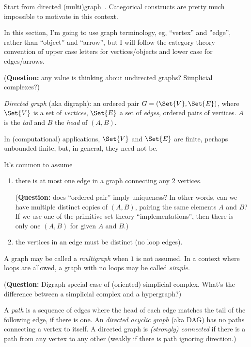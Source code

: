 \documentclass[11pt,openany]{article}
\begin{document}
Start from directed (multi)graph~\cite{wiki:Directed_graph}.
Categorical constructs are pretty much impossible to motivate
in this context.

In this section, I'm going to use graph terminology,
eg, ``vertex'' and ''edge'', rather than ``object'' and ``arrow'',
but I will follow the category theory convention of
upper case letters for vertices/objects and lower case for
edges/arrows.

\label{sec:Directed_graph}

(\textbf{Question:}
 any value is thinking about undirected graphs?
 Simplicial complexes?)

\textit{Directed graph} (aka digraph): 
an ordered pair $G=\left( \Set{V}, \Set{E} \right)$,
where $\Set{V}$ is a set of \textit{vertices}, 
$\Set{E}$ a set of \textit{edges}, ordered pairs of vertices.
$A$ is the \textit{tail} and $B$ the \textit{head}
of $\left(A,B\right)$.

In (computational) applications, $\Set{V}$ and $\Set{E}$ 
are finite, perhaps unbounded finite,
but, in general, they need not be.

It's common to assume 
\begin{enumerate}
\item there is at most one edge
in a graph connecting any $2$ vertices.\par
(\textbf{Question:} does ``ordered pair'' imply uniqueness?
In other words, can we have multiple distinct copies of
 $\left(A,B\right)$, pairing the same elements $A$ and $B$?
 If we use one of the primitive set theory ``implementations'',
 then there is only one $\left(A,B\right)$ 
 for given $A$ and $B$.)
\item the vertices in an edge must be 
distinct (no loop edges).
\end{enumerate}

A graph may be called a \textit{multigraph} when $1$ is
not assumed.
In a context where loops are allowed,
a graph with no loops may be called \textit{simple}.

(\textbf{Question:} 
Digraph special case of (oriented) simplicial complex.
What's the difference between a simplicial complex 
and a hypergraph?)

A \textit{path} is a sequence of edges where the head of each
edge matches the tail of the following edge, if there is one.
An \textit{directed acyclic graph} (aka DAG) has no paths
connecting a vertex to itself.
A directed graph is \textit{(strongly) connected} if there is a path
from any vertex to any other (weakly if there is path
ignoring direction.)
\end{document}

